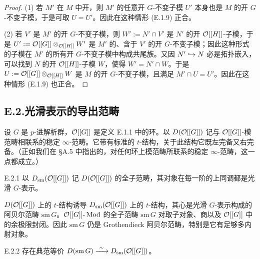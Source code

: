 \begin{proof}
(1) 若 $M'$ 在 $M$ 中开，则 $M'$ 的任意开 $G$-不变子模 $U'$ 本身也是 $M$ 的开 $G$-不变子模，于是可取 $U=U'$。因此在这种情形 (E.1.9) 正合。

(2) 若 $V'$ 是 $M'$ 的开 $G$-不变子模，则 $W':=N'\cap V'$ 是 $N'$ 的开 $\mathcal{O}[[H]]$-子模，于是 $U':=\mathcal{O}[[G]]\otimes_{\mathcal{O}[[H]]}W'$ 是 $M'$ 的、含于 $V'$ 的开 $G$-不变子模；因此这种形式的子模在 $M'$ 的所有开 $G$-不变子模中构成共尾族。又因 $N'\hookrightarrow N$ 必是拓扑嵌入，可以找到 $N$ 的开 $\mathcal{O}[[H]]$-子模 $W$，使得 $W'=N'\cap W$。于是 $U:=\mathcal{O}[[G]]\otimes_{\mathcal{O}[[H]]}W$ 是 $M$ 的开 $G$-不变子模，且满足 $M'\cap U=U'$。因此在这种情形 (E.1.9) 也正合。
\end{proof}

\subsection*{E.2.\quad 光滑表示的导出范畴}

设 $G$ 是 $p$-进解析群，$\mathcal{O}[[G]]$ 是定义 E.1.1 中的环。以 $D(\mathcal{O}[[G]])$ 记与 $\mathcal{O}[[G]]$-模范畴相联系的稳定 $\infty$-范畴。它带有标准的 $t$-结构，关于此结构它既左完备又右完备。（正如我们在 §A.5 中指出的，对任何环上模范畴所联系的稳定 $\infty$-范畴，这一点都成立。）

\begin{defn}{E.2.1}\label{thm:a4-20-12}
以 $D_{\mathrm{sm}}(\mathcal{O}[[G]])$ 记 $D(\mathcal{O}[[G]])$ 的全子范畴，其对象在每一阶的上同调都是光滑 $G$-表示。
\end{defn}

$D(\mathcal{O}[[G]])$ 上的 $t$-结构诱导 $D_{\mathrm{sm}}(\mathcal{O}[[G]])$ 上的 $t$-结构，其心是光滑 $G$-表示构成的阿贝尔范畴 $\mathrm{sm}\,G$。$\mathcal{O}[[G]]\text{-}\operatorname{Mod}$ 的全子范畴 $\mathrm{sm}\,G$ 对取子对象、商以及 $\mathcal{O}[[G]]$ 中的余极限封闭。因此 $\mathrm{sm}\,G$ 仍是 Grothendieck 阿贝尔范畴，特别是它有足够多内射对象。

\begin{prop}{E.2.2}\label{thm:a4-20-13}
存在典范等价 $D(\mathrm{sm}\,G)\xrightarrow{\ \sim\ } D_{\mathrm{sm}}(\mathcal{O}[[G]])$。
\end{prop}

